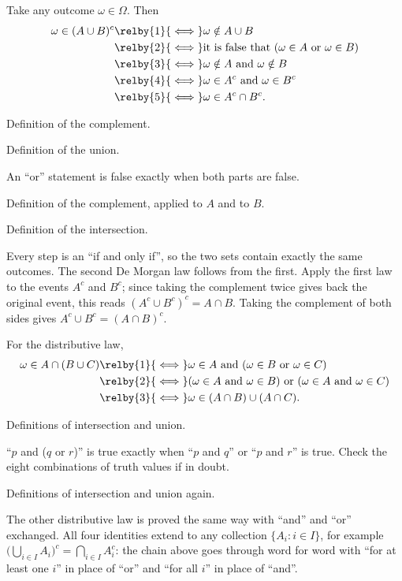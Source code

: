 Take any outcome $\omega\in\Omega$. Then
\begin{align*}
\omega\in(A\cup B)^c
&\relby{1}{\iff} \omega\notin A\cup B\\
&\relby{2}{\iff} \text{it is false that } (\omega\in A \text{ or } \omega\in B)\\
&\relby{3}{\iff} \omega\notin A \text{ and } \omega\notin B\\
&\relby{4}{\iff} \omega\in A^c \text{ and } \omega\in B^c\\
&\relby{5}{\iff} \omega\in A^c\cap B^c .
\end{align*}
\begin{explain}
  \item Definition of the complement.
  \item Definition of the union.
  \item An ``or'' statement is false exactly when both parts are false.
  \item Definition of the complement, applied to $A$ and to $B$.
  \item Definition of the intersection.
\end{explain}
Every step is an ``if and only if'', so the two sets contain exactly the same
outcomes. The second De Morgan law follows from the first. Apply the first law
to the events $A^c$ and $B^c$; since taking the complement twice gives back the
original event, this reads $(A^c\cup B^c)^c=A\cap B$. Taking the complement of
both sides gives $A^c\cup B^c=(A\cap B)^c$.

For the distributive law,
\begin{align*}
\omega\in A\cap(B\cup C)
&\relby{1}{\iff} \omega\in A \text{ and } (\omega\in B \text{ or } \omega\in C)\\
&\relby{2}{\iff} (\omega\in A \text{ and } \omega\in B) \text{ or } (\omega\in A \text{ and } \omega\in C)\\
&\relby{3}{\iff} \omega\in (A\cap B)\cup(A\cap C).
\end{align*}
\begin{explain}
  \item Definitions of intersection and union.
  \item ``$p$ and ($q$ or $r$)'' is true exactly when ``$p$ and $q$'' or
        ``$p$ and $r$'' is true. Check the eight combinations of truth values
        if in doubt.
  \item Definitions of intersection and union again.
\end{explain}
The other distributive law is proved the same way with ``and'' and ``or''
exchanged. All four identities extend to any collection $\{A_i: i\in I\}$,
for example $\bigl(\bigcup_{i\in I}A_i\bigr)^c=\bigcap_{i\in I}A_i^c$: the
chain above goes through word for word with ``for at least one $i$'' in place of
``or'' and ``for all $i$'' in place of ``and''.

